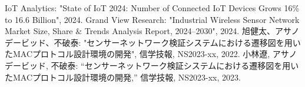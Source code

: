 \documentclass[technicalreport]{ieicej}
\begin{document}

%
%

\begin{thebibliography}{99}
 IoT Analytics: "State of IoT 2024: Number of Connected IoT Devices Grows 16\% to 16.6 Billion", 2024.  
 Grand View Research: "Industrial Wireless Sensor Network Market Size, Share \& Trends Analysis Report, 2024–2030", 2024.
 旭健太、アサノデービッド、不破泰: "センサーネットワーク検証システムにおける遷移図を用いたMACプロトコル設計環境の開発", 信学技報, NS2023-xx, 2022.
 小林遼, アサノデービッド, 不破泰:
“センサーネットワーク検証システムにおける遷移図を用いたMACプロトコル設計環境の開発,”
信学技報, NS2023-xx, 2023.

\end{thebibliography}
\end{document}
